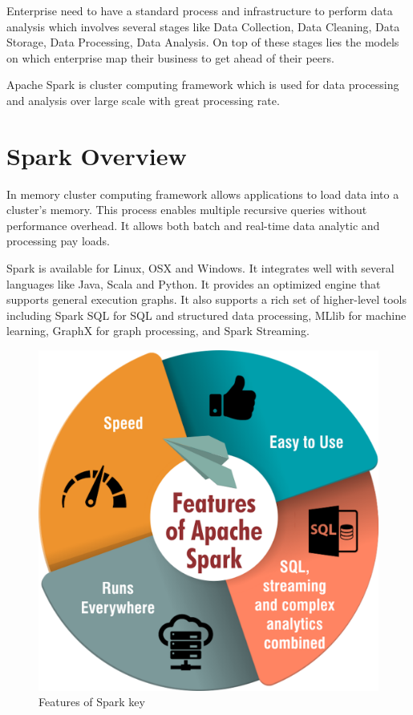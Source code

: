 Enterprise need to have a standard process and infrastructure to perform data
analysis which involves several stages like Data Collection, Data Cleaning,
Data Storage, Data Processing, Data Analysis. On top of these stages lies the
models on which enterprise map their business to get ahead of their peers.


Apache Spark is cluster computing framework which is used for data processing
and analysis over large scale with great processing rate.


\section{Spark Overview}


In memory cluster computing framework allows applications to load data into a
cluster’s memory. This process enables multiple recursive queries without
performance overhead. It allows both batch and real-time data analytic and
processing pay loads.


Spark is available for Linux, OSX and Windows. It integrates well with several
languages like Java, Scala and Python. It provides an optimized engine that
supports general execution graphs. It also supports a rich set of higher-level
tools including Spark SQL for SQL and structured data processing, MLlib for
machine learning, GraphX for graph processing, and Spark Streaming.

\begin{figure}[!ht]
  \centering\includegraphics[width=\columnwidth]{images/sparkfeatures.png}
  \caption{Features
  of Spark
  key~\cite{hid-sp18-522-sparkfeatures-image} }\label{f:fig1}
\end{figure}

